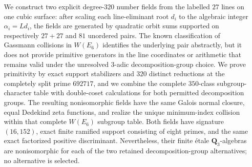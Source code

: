 We construct two explicit degree-$320$ number fields from the labelled $27$
lines on one cubic surface: after scaling each line-eliminant root $d_i$ to
the algebraic integer $\alpha_i=Ld_i$, the fields are generated by quadratic
orbit sums supported on respectively $27+27$ and $81$ unordered pairs.
The known classification of Gassmann collisions in $W(E_6)$ identifies the
underlying pair abstractly, but it does not provide primitive generators in
the line coordinates or arithmetic that remains valid under the unresolved
$3$-adic decomposition-group choice.  We prove primitivity by exact support
stabilizers and $320$ distinct reductions at the completely split prime
$692717$, and we combine the complete $350$-class subgroup-character table
with double-coset calculations for both permitted decomposition groups.
The resulting nonisomorphic fields have the same Galois normal closure, equal
Dedekind zeta functions, and realize the unique minimum-index collision
within that complete $W(E_6)$ subgroup table.  Both fields have signature
$(16,152)$, exact finite ramified support consisting of eight primes, and
the same exact factorized positive discriminant.  Nevertheless, their finite
\'{e}tale $\mathbf Q_3$-algebras are nonisomorphic for each of the two
retained decomposition-group alternatives; no alternative is selected.
